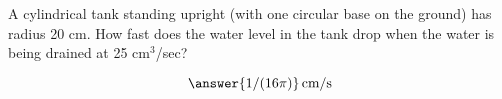 \documentclass{ximera}
\author{Bart Snapp}
\begin{document}
\begin{exercise}
A cylindrical tank standing upright (with one circular base on the
ground) has radius 20 cm.  How fast does the water level in the
tank drop when the water is being drained at 25 cm${}^3$/sec?
\begin{prompt}
  \[
  \answer{1/(16\pi)}\,\text{cm/s}
  \]
\end{prompt}
\end{exercise}
\end{document}
